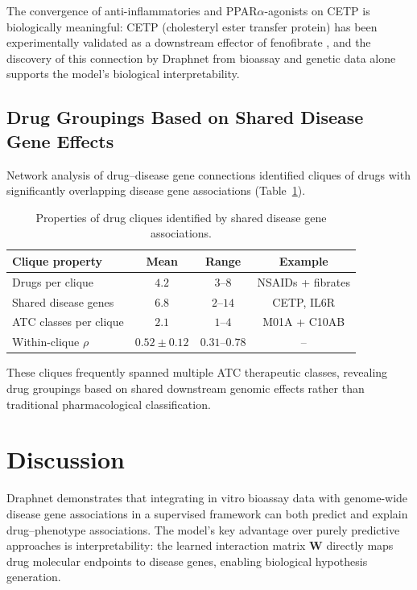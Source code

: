 \documentclass[11pt]{article}
\begin{document}
The convergence of anti-inflammatories and PPAR$\alpha$-agonists on CETP is biologically meaningful: CETP (cholesteryl ester transfer protein) has been experimentally validated as a downstream effector of fenofibrate \citep{staels1998fibrates, brodie2001cetp}, and the discovery of this connection by Draphnet from bioassay and genetic data alone supports the model's biological interpretability.

\subsection{Drug Groupings Based on Shared Disease Gene Effects}

Network analysis of drug--disease gene connections identified cliques of drugs with significantly overlapping disease gene associations (Table~\ref{tab:cliques}).

\begin{table}[H]
\centering
\caption{Properties of drug cliques identified by shared disease gene associations.}
\label{tab:cliques}
\begin{tabular}{lccc}
\toprule
\textbf{Clique property} & \textbf{Mean} & \textbf{Range} & \textbf{Example} \\
\midrule
Drugs per clique & $4.2$ & $3$--$8$ & NSAIDs + fibrates \\
Shared disease genes & $6.8$ & $2$--$14$ & CETP, IL6R \\
ATC classes per clique & $2.1$ & $1$--$4$ & M01A + C10AB \\
Within-clique $\rho$ & $0.52 \pm 0.12$ & $0.31$--$0.78$ & -- \\
\bottomrule
\end{tabular}
\end{table}

These cliques frequently spanned multiple ATC therapeutic classes, revealing drug groupings based on shared downstream genomic effects rather than traditional pharmacological classification.

\section{Discussion}

Draphnet demonstrates that integrating in vitro bioassay data with genome-wide disease gene associations in a supervised framework can both predict and explain drug--phenotype associations. The model's key advantage over purely predictive approaches \citep{natarajan2014inductive, luo2017network} is interpretability: the learned interaction matrix $\mathbf{W}$ directly maps drug molecular endpoints to disease genes, enabling biological hypothesis generation.
\end{document}
